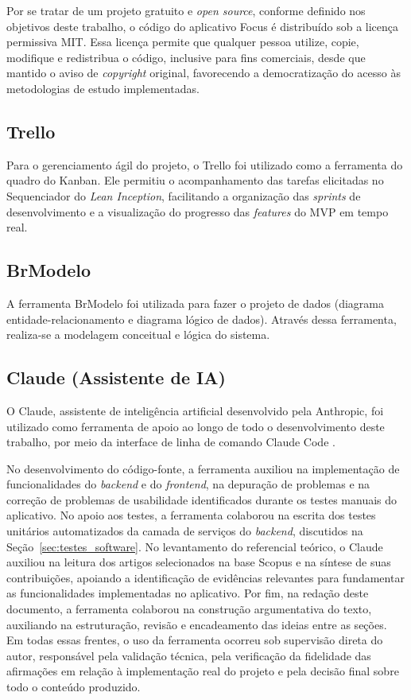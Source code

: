 Por se tratar de um projeto gratuito e \textit{open source}, conforme definido nos objetivos deste trabalho, o código do aplicativo Focus é distribuído sob a licença permissiva MIT.
Essa licença permite que qualquer pessoa utilize, copie, modifique e redistribua o código, inclusive para fins comerciais, desde que mantido o aviso de \textit{copyright} original, favorecendo a democratização do acesso às metodologias de estudo implementadas.

\subsection{Trello}

Para o gerenciamento ágil do projeto, o Trello foi utilizado como a ferramenta do quadro do Kanban.
Ele permitiu o acompanhamento das tarefas elicitadas no Sequenciador do \textit{Lean Inception}, facilitando a organização das \textit{sprints} de desenvolvimento e a visualização do progresso das \textit{features} do MVP em tempo real.

\subsection{BrModelo}

A ferramenta BrModelo foi utilizada para fazer o projeto de dados (diagrama entidade-relacionamento e diagrama lógico de dados).
Através dessa ferramenta, realiza-se a modelagem conceitual e lógica do sistema.

\subsection{Claude (Assistente de IA)}

O Claude, assistente de inteligência artificial desenvolvido pela Anthropic, foi utilizado como ferramenta de apoio ao longo de todo o desenvolvimento deste trabalho, por meio da interface de linha de comando Claude Code \cite{anthropic_2026}.

No desenvolvimento do código-fonte, a ferramenta auxiliou na implementação de funcionalidades do \textit{backend} e do \textit{frontend}, na depuração de problemas e na correção de problemas de usabilidade identificados durante os testes manuais do aplicativo.
No apoio aos testes, a ferramenta colaborou na escrita dos testes unitários automatizados da camada de serviços do \textit{backend}, discutidos na Seção~\ref{sec:testes_software}.
No levantamento do referencial teórico, o Claude auxiliou na leitura dos artigos selecionados na base Scopus e na síntese de suas contribuições, apoiando a identificação de evidências relevantes para fundamentar as funcionalidades implementadas no aplicativo.
Por fim, na redação deste documento, a ferramenta colaborou na construção argumentativa do texto, auxiliando na estruturação, revisão e encadeamento das ideias entre as seções.
Em todas essas frentes, o uso da ferramenta ocorreu sob supervisão direta do autor, responsável pela validação técnica, pela verificação da fidelidade das afirmações em relação à implementação real do projeto e pela decisão final sobre todo o conteúdo produzido.

